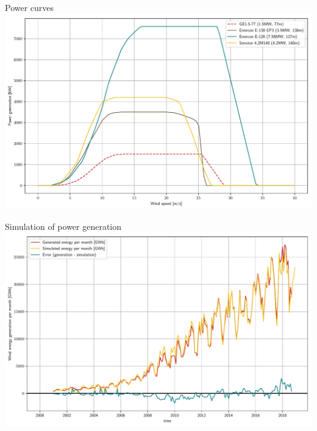 \documentclass[color=usenames,dvipsnames]{beamer}
\begin{document}
    \begin{frame}{Power curves}
        \includegraphics[width=\textwidth]{../../figures/power_curves.pdf}
    \end{frame}

    \begin{frame}{Simulation of power generation}
        \includegraphics[width=\textwidth]{../../figures/simulated-energy_time-series.pdf}
    \end{frame}


\end{document}
